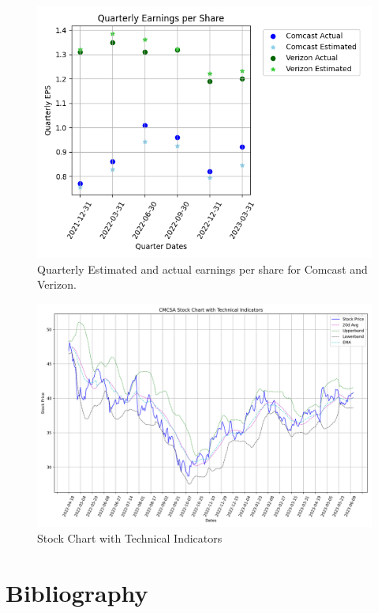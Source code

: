 \documentclass[conference]{IEEEtran}
\begin{document}
\begin{figure}
    \includegraphics[width=\columnwidth]{earnings}
    \caption{Quarterly Estimated and actual earnings per share for Comcast and Verizon.}
\end{figure}

\begin{figure}
    \includegraphics[width=\columnwidth]{tech_indicators}
    \caption{Stock Chart with Technical Indicators}
\end{figure}

\section*{Bibliography}
\end{document}
